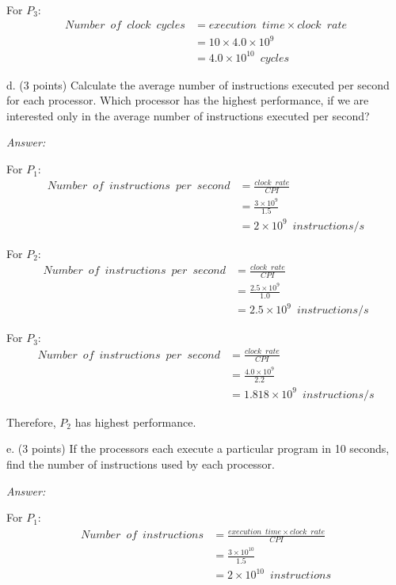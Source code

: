 \documentclass[11pt]{article}
\newcommand{\answer}{{\color{red}\textit{Answer: }}}
\begin{document}
For $P_3$:
\begin{align*}
    Number \enspace of \enspace clock \enspace cycles 
                    &= execution \enspace time \times clock \enspace rate\\
                    &= 10 \times 4.0 \times 10^{9}\\ 
                    &= 4.0 \times 10^{10} \enspace cycles
\end{align*}

d. (3 points) Calculate the average number of instructions executed per second for each processor.  Which processor has the highest performance, if we are interested only in the average number of instructions executed per second?

\answer

For $P_1$:
\begin{align*}
    Number\enspace of \enspace instructions \enspace per \enspace second 
                     &= \frac{clock \enspace rate}{CPI}\\
                     &= \frac{3 \times 10^{9}}{1.5}\\ 
                     &= 2 \times 10^{9} \enspace instructions/s
\end{align*}

For $P_2$:
\begin{align*}
     Number\enspace of \enspace instructions \enspace per \enspace second
                     &= \frac{clock \enspace rate}{CPI}\\
                     &= \frac{2.5 \times 10^{9}}{1.0}\\ 
                     &= 2.5 \times 10^{9} \enspace instructions/s
\end{align*}

For $P_3$:
\begin{align*}
    Number\enspace of \enspace instructions \enspace per \enspace second 
                     &= \frac{clock \enspace rate}{CPI}\\
                     &= \frac{4.0 \times 10^{9}}{2.2}\\ 
                     &= 1.818 \times 10^{9} \enspace instructions/s
\end{align*}

Therefore, $P_2$ has highest performance.

e. (3 points) If the processors each execute a particular program in 10 seconds, find the number of instructions used by each processor.

\answer

For $P_1$:
\begin{align*}
    Number \enspace of \enspace instructions 
                     &= \frac{execution \enspace time \times clock \enspace rate}{CPI}\\
                     &= \frac{3 \times 10^{10}}{1.5}\\ 
                     &= 2 \times 10^{10} \enspace instructions
\end{align*}
\end{document}

